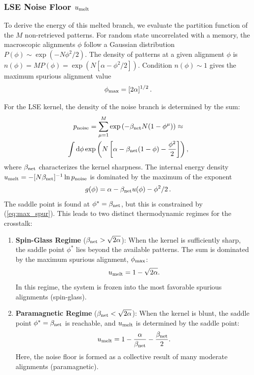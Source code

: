 \documentclass{article}
\newcommand{\dd}{{\mathrm{d}}}
\theoremstyle{plain}
\theoremstyle{definition}
\theoremstyle{remark}
\begin{document}
\subsubsection{LSE Noise Floor $u_{\rm melt}$}

To derive the energy of this melted branch, we evaluate the partition function of the $M$ non-retrieved patterns. For random state  uncorrelated with a memory, the macroscopic alignments $\phi$ follow a Gaussian distribution $P(\phi) \sim \exp(-N\phi^2/2)$. The density of patterns at a given alignment $\phi$ is $n(\phi) = M P(\phi) = \exp(N[\alpha - \phi^2/2])$. Condition $n(\phi) \sim 1$ gives the maximum spurious alignment value 
\begin{equation}
    \phi_{\rm max} = [2\alpha]^{1/2}\,.
    \label{eq:max_spur}
\end{equation}

For the LSE kernel, the density of the noise branch is determined by the sum:
\begin{multline}
    p_{\rm noise} = \sum_{\mu=1}^{M} \exp\left( -\beta_{\rm net} N (1 - \phi^\mu) \right) \approx \\
    \int \dd\phi \exp\left( N \left[ \alpha - \beta_{\rm net}(1 - \phi) - \frac{\phi^2}{2} \right] \right),
\end{multline}
where $\beta_{\rm net}$ characterizes the kernel sharpness. The internal energy density $u_{\rm melt} = - [{N\beta_{\rm net}}]^{-1} \ln p_{\rm noise}$ is dominated by the maximum of the exponent 
\begin{equation}
    g(\phi) = \alpha - \beta_{\rm net} u(\phi) - \phi^2/2\,.
    \label{eq:g_phi}
\end{equation}
The saddle point is found at $\phi^* = \beta_{\rm net}$, but this is constrained by (\ref{eq:max_spur}). This leads to two distinct thermodynamic regimes for the crosstalk:

\begin{enumerate}
    \item \textbf{Spin-Glass Regime} ($\beta_{\rm net} > \sqrt{2\alpha}$): 
    When the kernel is sufficiently sharp, the saddle point $\phi^*$ lies beyond the available patterns. The sum is dominated by the maximum spurious alignment, $\phi_{\rm max}$:
    \begin{equation}
        u_{\rm melt} = 1 - \sqrt{2\alpha}.
    \end{equation}
    In this regime, the system is frozen into the most favorable spurious alignments (spin-glass).
    
    \item \textbf{Paramagnetic Regime} ($\beta_{\rm net} < \sqrt{2\alpha}$): 
    When the kernel is blunt, the saddle point $\phi^* = \beta_{\rm net}$ is reachable, and $u_{\rm melt}$ is determined by the saddle point:
    \begin{equation}
        u_{\rm melt} = 1 - \frac{\alpha}{\beta_{\rm net}} - \frac{\beta_{\rm net}}{2}.
    \end{equation}
    Here, the noise floor is formed as a collective result of many moderate alignments (paramagnetic).
\end{enumerate}
\end{document}
